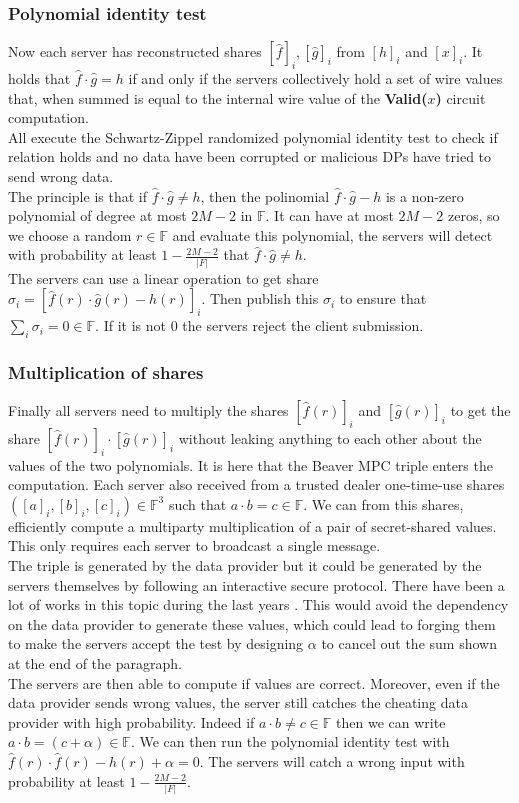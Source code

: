 \documentclass{article}
\begin{document}
\subsubsection{Polynomial identity test}
Now each server has reconstructed shares $[\hat{f}]_i, [\hat{g}]_i$ from $[h]_i$ and $[x]_i$. It holds that $ \hat{f} \cdot \hat{g} = h$ if and only if the servers collectively hold a set of wire values that, when summed is equal to the internal wire value of the \textbf{Valid($x$)} circuit computation.\\
All execute the Schwartz-Zippel randomized polynomial identity test \cite{polyverif} to check if relation holds and no data have been corrupted or malicious DPs have tried to send wrong data.\\
The principle is that if $ \hat{f} \cdot \hat{g} \neq h$, then the polinomial $ \hat{f} \cdot \hat{g} - h$ is a non-zero polynomial of degree at most $2M-2$ in $\mathbb{F}$. It can have at most $2M-2$ zeros, so we choose a random $r \in \mathbb{F}$ and evaluate this polynomial, the servers will detect with probability at least $1 - \frac{2M-2}{|F|}$ that $ \hat{f} \cdot \hat{g} \neq h$.\\
The servers can use a linear operation to get share $\sigma_i = [ \hat{f}(r) \cdot \hat{g}(r) - h(r)]_i$. Then publish this $\sigma_i$ to ensure that $\sum_{i}{\sigma_i} = 0 \in \mathbb{F}$. If it is not $0$ the servers reject the client submission.
\subsubsection{Multiplication of shares}
Finally all servers need to multiply the shares $ [\hat{f}(r)]_i $ and $ [\hat{g}(r)]_i$ to get the share $[\hat{f}(r)]_i \cdot [\hat{g}(r)]_i$ without leaking anything to each other about the values of the two polynomials. It is here that the Beaver MPC triple enters the computation. Each server also received from a trusted dealer one-time-use shares $([a]_i,[b]_i,[c]_i) \in \mathbb{F}^3 $ such that $a \cdot b = c \in \mathbb{F}$. We can from this shares, efficiently compute a multiparty multiplication of a pair of secret-shared values. This only requires each server to broadcast a single message.\\
The triple is generated by the data provider but it could be generated by the servers themselves by following an interactive secure protocol. There have been a lot of works in this topic during the last years \cite{auth}. This would avoid the dependency on the data provider to generate these values, which could lead to forging them to make the servers accept the test by designing $\alpha$ to cancel out the sum shown at the end of the paragraph.\\
The servers are then able to compute if values are correct. Moreover, even if the data provider sends wrong values, the server still catches the cheating data provider with high probability. Indeed if $a \cdot b \neq c \in \mathbb{F}$ then we can write $a \cdot b = (c + \alpha) \in \mathbb{F}$. We can then run the polynomial identity test with $\hat{f}(r) \cdot \hat{f}(r) - h(r) + \alpha = 0$. The servers will catch a wrong input with probability at least $1 - \frac{2M-2}{|F|}$.
\end{document}
